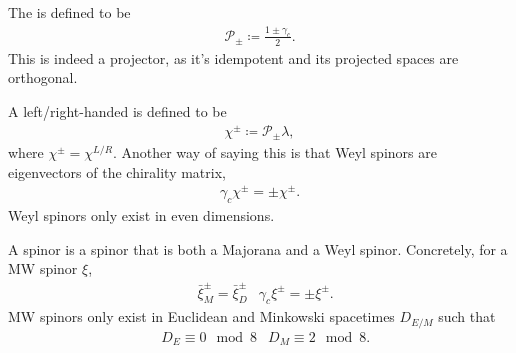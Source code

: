 \documentclass[11pt]{article}
\begin{document}
\begin{definition}
    The  is defined to be
    \begin{align*}
        \mathcal{P}_{\pm} \coloneqq \frac{1 \pm \gamma_c}{2}.
    \end{align*}
    This is indeed a projector, as it's idempotent and
    its projected spaces are orthogonal.
\end{definition}

\begin{definition}
    A left/right-handed  is defined to be
    \begin{align*}
        \chi^{\pm} \coloneqq \mathcal{P}_{\pm} \lambda,
    \end{align*}
    where $\chi^{\pm} = \chi^{L/R}$. Another way of saying this 
    is that Weyl spinors are eigenvectors of the chirality matrix,
    \begin{align*}
        \gamma_c \chi^{\pm} = \pm \chi^{\pm}.
    \end{align*}
    Weyl spinors only exist in even dimensions.
\end{definition}

\begin{definition}
    A  spinor is a spinor that is both a
    Majorana and a Weyl spinor. Concretely, for a MW spinor $\xi$,
    \begin{align*}
        & \bar{\xi}^{\pm}_M = \bar{\xi}^{\pm}_D
        & \gamma_c \xi^{\pm} = \pm \xi^{\pm}.
    \end{align*}
    MW spinors only exist in Euclidean and Minkowski spacetimes $D_{E/M}$ 
    such that
    \begin{align*}
        & D_E \equiv 0 \mod 8
        & D_M \equiv 2 \mod 8.
    \end{align*}
\end{definition}
\end{document}
